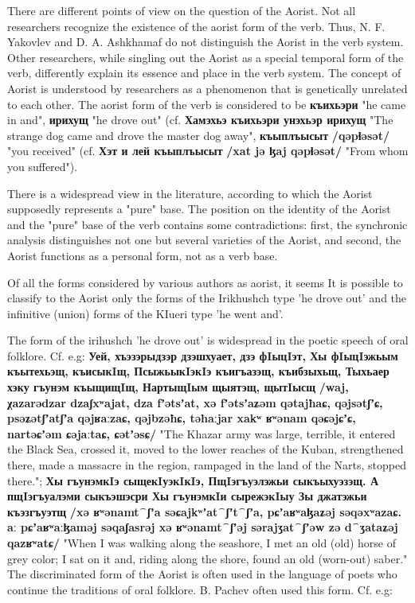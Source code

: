 \documentclass[a4paper,12pt]{book}
\newcommand{\1}[1]{\textbf{\emph{#1}}} %
\newcommand{\2}[1]{\textbf{[#1]}} %
\newcommand{\3}[1]{\fontsize{11pt}{0cm}\textbf{\emph{#1}}} %
\newcommand{\4}[1]{\fontsize{10pt}{0cm}\emph{#1}}	%
\newcommand{\5}[1]{\textbf{/#1/}} %
\newcommand{\6}[1]{\textbf{[#1]}} %
\newcommand{\7}[1]{\fontsize{12pt}{0cm}\emph{#1}} %
\newcommand{\8}[1]{\fontsize{12pt}{0cm}`#1'} %
\newcommand{\9}[1]{\fontsize{12pt}{0cm}(lit. `#1')} %
\newcommand{\glossphonemics}[1]{\textbf{/#1/}} %
\begin{document}
There are different points of view on the question of the Aorist. Not all researchers recognize the existence of the aorist form of the verb. Thus, N. F. Yakovlev and D. A. Ashkhamaf do not distinguish the Aorist in the verb system. Other researchers, while singling out the Aorist as a special temporal form of the verb, differently explain its essence and place in the verb system. The concept of Aorist is understood by researchers as a phenomenon that is genetically unrelated to each other. The aorist form of the verb is considered to be \textbf{къихьэри} "he came in and", \textbf{ирихущ} "he drove out" (cf. \textbf{Хамэхьэ къихьэри унэхьэр ирихущ} "The strange dog came and drove the master dog away", \textbf{къыплъысыт} \glossphonemics{qəpɬəsət} "you received" (cf. \textbf{Хэт и лей къыплъысыт} \glossphonemics{xat jə ɮaj qəpɬəsət} "From whom you suffered").

There is a widespread view in the literature, according to which the Aorist supposedly represents a "pure" base. The position on the identity of the Aorist and the "pure" base of the verb contains some contradictions: first, the synchronic analysis distinguishes not one but several varieties of the Aorist, and second, the Aorist functions as a personal form, not as a verb base.

Of all the forms considered by various authors as aorist, it seems It is possible to classify to the Aorist only the forms of the Irikhushch type 'he drove out' and the infinitive (union) forms of the KIueri type 'he went and'.

The form of the irihushch 'he drove out' is widespread in the poetic speech of oral folklore. Cf. e.g:
\textbf{Уей, хъэзэрыдзэр дзэшхуает, дзэ фIыцIэт, Хы фIыцIэжьым къытехьэщ, къисыкIщ, ПсыжьыкIэкIэ къигъазэщ, къибзыхьщ, Тыхьаер хэку гъунэм къыщищIщ, НартыщIым щыятэщ, щытIысщ} \glossphonemics{waj, χazarədzar dzaʃxʷajat, dza fʼətsʼat, xə fʼətsʼaʑəm qətajħaɕ, qəjsətʃʼɕ, psəʑətʃʼatʃʼa qəjʁaːzaɕ, qəjbzəħɕ, təħaːjar xakʷ ʁʷənam qəɕəjɕʼɕ, nartəɕʼəm ɕəjaːtaɕ, ɕətʼəsɕ} "The Khazar army was large, terrible, it entered the Black Sea, crossed it, moved to the lower reaches of the Kuban, strengthened there, made a massacre in the region, rampaged in the land of the Narts, stopped there."; \textbf{Хы гъунэмкIэ сыщекIуэкIкIэ, ПщIэгъуэлэжьи сыкъыхуэзэщ. А пщIэгъуалэми сыкъэшэсри Хы гъунэмкIи сырежэкIыу Зы джатэжьи къэзгъуэтщ} \glossphonemics{xə ʁʷənamt⁀ʃʼa səɕajkʷʼat⁀ʃʼt⁀ʃʼa, pɕʼaʁʷaɮaʑəj səqəxʷazaɕ. aː pɕʼaʁʷaːɮaməj səqaʃasrəj xə ʁʷənamt⁀ʃʼəj sərajʒat⁀ʃʼəw zə d⁀ʒataʑəj qazʁʷatɕ} "When I was walking along the seashore, I met an old (old) horse of grey color; I sat on it and, riding along the shore, found an old (worn-out) saber."
The discriminated form of the Aorist is often used in the language of poets who continue the traditions of oral folklore. B. Pachev often used this form. Cf. e.g:
\end{document}
